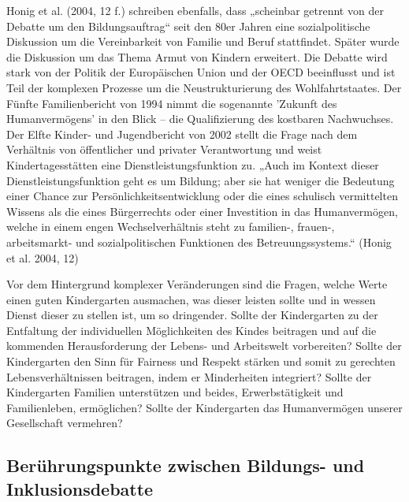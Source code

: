 Honig et al. (2004, 12 f.) schreiben ebenfalls, dass „scheinbar getrennt von der Debatte um den Bildungsauftrag“ seit den 80er Jahren eine sozialpolitische Diskussion um die Vereinbarkeit von Familie und Beruf stattfindet. Später wurde die Diskussion um das Thema Armut von Kindern erweitert. Die Debatte wird stark von der Politik der Europäischen Union und der OECD beeinflusst und ist Teil der komplexen Prozesse um die Neustrukturierung des Wohlfahrtstaates. 
Der Fünfte Familienbericht von 1994 nimmt die sogenannte 'Zukunft des Humanvermögens' in den Blick -- die Qualifizierung des kostbaren Nachwuchses. Der Elfte Kinder- und Jugendbericht von 2002 stellt die Frage nach dem Verhältnis von öffentlicher und privater Verantwortung und weist Kindertagesstätten eine Dienstleistungsfunktion zu. „Auch im Kontext dieser Dienstleistungsfunktion geht es um Bildung; aber sie hat weniger die Bedeutung einer Chance zur Persönlichkeitsentwicklung oder die eines schulisch vermittelten Wissens als die eines Bürgerrechts oder einer Investition in das Humanvermögen, welche in einem engen Wechselverhältnis steht zu familien-, frauen-, arbeitsmarkt- und sozialpolitischen Funktionen des Betreuungssystems.“ (Honig et al. 2004, 12)  
 
Vor dem Hintergrund komplexer Veränderungen sind die Fragen, welche Werte einen guten Kindergarten ausmachen, was dieser leisten sollte und in wessen Dienst dieser zu stellen ist, um so dringender. Sollte der Kindergarten zu der Entfaltung der individuellen Möglichkeiten des Kindes beitragen und auf die kommenden Herausforderung der Lebens- und Arbeitswelt vorbereiten? Sollte der Kindergarten den Sinn für Fairness und Respekt stärken und somit zu gerechten Lebensverhältnissen beitragen, indem er Minderheiten integriert? Sollte der Kindergarten Familien unterstützen und beides, Erwerbstätigkeit und Familienleben, ermöglichen? Sollte der Kindergarten das Humanvermögen unserer Gesellschaft vermehren? 

\subsection{Berührungspunkte zwischen Bildungs- und Inklusionsdebatte}

